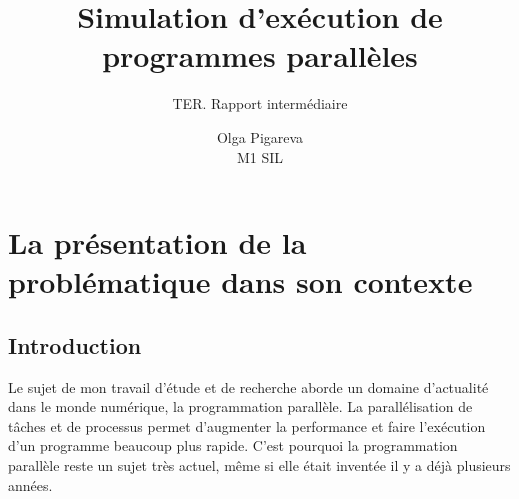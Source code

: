 \documentclass[12pt]{scrartcl}
\begin{document}
\pagestyle{fancy}
\rhead{  }

\title{%
Simulation d'exécution de programmes parallèles\\
\large } 

\subtitle{ TER. Rapport intermédiaire}
\author{Olga Pigareva\\
M1 SIL} %






\maketitle

\newpage

\tableofcontents %

\newpage %

\section{La présentation de la problématique dans son contexte}

\subsection{Introduction}
Le sujet de mon travail d'étude et de recherche aborde un domaine d'actualité dans le monde numérique, la programmation parallèle.
La parallélisation de tâches et de processus permet d'augmenter la performance et faire l'exécution d'un programme beaucoup plus rapide. 
C'est pourquoi la programmation parallèle reste un sujet très actuel, même si elle était inventée il y a déjà plusieurs années.\\
\end{document}
